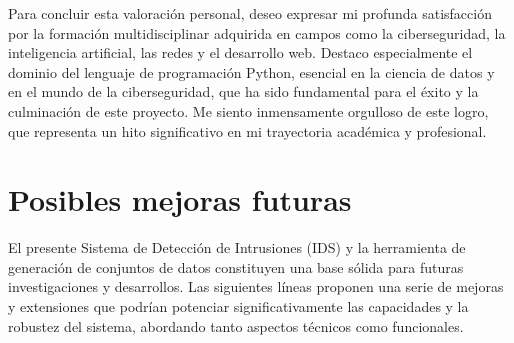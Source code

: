 Para concluir esta valoración personal, deseo expresar mi profunda satisfacción por la formación multidisciplinar adquirida en campos como la ciberseguridad, la inteligencia artificial, las redes y el desarrollo web. Destaco especialmente el dominio del lenguaje de programación Python, esencial en la ciencia de datos y en el mundo de la ciberseguridad, que ha sido fundamental para el éxito y la culminación de este proyecto. Me siento inmensamente orgulloso de este logro, que representa un hito significativo en mi trayectoria académica y profesional.

\section{Posibles mejoras futuras}

El presente Sistema de Detección de Intrusiones (IDS) y la herramienta de generación de conjuntos de datos constituyen una base sólida para futuras investigaciones y desarrollos. Las siguientes líneas proponen una serie de mejoras y extensiones que podrían potenciar significativamente las capacidades y la robustez del sistema, abordando tanto aspectos técnicos como funcionales.

